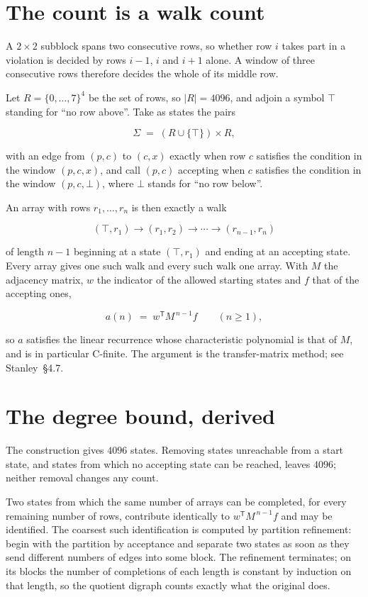 \documentclass[11pt]{article}
\theoremstyle{definition}
\begin{document}
\section{The count is a walk count}

A $2 \times 2$ subblock spans two consecutive rows, so whether row $i$ takes part in a violation is decided by rows $i-1$, $i$ and $i+1$ alone. A window of three consecutive rows therefore decides the whole of its middle row.

Let $R = \{0,\dots,7\}^{4}$ be the set of rows, so $|R| = 4096$, and adjoin a symbol $\top$ standing for ``no row above''. Take as states the pairs

\[\Sigma \;=\; (R \cup \{\top\}) \times R,\]

with an edge from $(p,c)$ to $(c,x)$ exactly when row $c$ satisfies the condition in the window $(p,c,x)$, and call $(p,c)$ accepting when $c$ satisfies the condition in the window $(p,c,\bot)$, where $\bot$ stands for ``no row below''.

An array with rows $r_1,\dots,r_n$ is then exactly a walk

\[(\top,r_1) \to (r_1,r_2) \to \cdots \to (r_{n-1},r_n)\]

of length $n-1$ beginning at a state $(\top,r_1)$ and ending at an accepting state. Every array gives one such walk and every such walk one array. With $M$ the adjacency matrix, $w$ the indicator of the allowed starting states and $f$ that of the accepting ones,

\[a(n) \;=\; w^{\mathsf T} M^{\,n-1} f \qquad (n \ge 1),\]

so $a$ satisfies the linear recurrence whose characteristic polynomial is that of $M$, and is in particular C-finite. The argument is the transfer-matrix method; see Stanley~\S4.7.

\section{The degree bound, derived}

The construction gives $4096$ states. Removing states unreachable from a start state, and states from which no accepting state can be reached, leaves $4096$; neither removal changes any count.

Two states from which the same number of arrays can be completed, for every remaining number of rows, contribute identically to $w^{\mathsf T}M^{\,n-1}f$ and may be identified. The coarsest such identification is computed by partition refinement: begin with the partition by acceptance and separate two states as soon as they send different numbers of edges into some block. The refinement terminates; on its blocks the number of completions of each length is constant by induction on that length, so the quotient digraph counts exactly what the original does.
\end{document}
